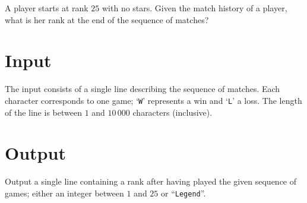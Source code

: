 A player starts at rank $25$ with no stars. Given the match history of a
player, what is her rank at the end of the sequence of matches?

\section*{Input}

The input consists of a single line describing the sequence of matches. Each character
corresponds to one game; `\texttt{W}' represents a win and `\texttt{L}' a loss. The length
of the line is between $1$ and $10\,000$ characters (inclusive).

\section*{Output}

Output a single line containing a rank after having played the given sequence of games; either
an integer between $1$ and $25$ or ``\texttt{Legend}''.
